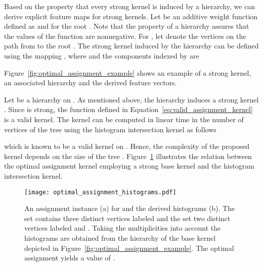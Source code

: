 \documentclass[twoside,11pt]{article}
\begin{document}
Based on the property that every strong kernel is induced by a hierarchy, we can derive explicit feature maps for strong kernels.
Let  be an additive weight function defined as  and  for the root .
Note that the property of a hierarchy assures that the values of the  function are nonnegative.
For , let  denote the vertices on the path from  to the root .
The strong kernel  induced by the hierarchy  can be defined using the mapping , where  and the components indexed by  are

Figure~\ref{fig:optimal_assignment_example} shows an example of a strong kernel, an associated hierarchy and the derived feature vectors.

Let  be a hierarchy on .
As mentioned above, the hierarchy  induces a strong kernel .
Since  is strong, the function  defined in Equation~\ref{eq:valid_assignment_kernel} is a valid kernel.
The kernel  can be computed in linear time in the number of vertices  of the tree  using the histogram intersection kernel \cite{swain1991color} as follows

which is known to be a valid kernel on  \cite{barla2003histogram}.
Hence, the complexity of the proposed kernel depends on the size of the tree .
Figure~\ref{fig:optimal_assignment_histograms} illustrates the relation between the optimal assignment kernel employing a strong base kernel and the histogram intersection kernel.
\begin{figure}[t]
  \centering
  \texttt{[image: optimal\_assignment\_histograms.pdf]}
  \caption{An assignment instance (a) for  and the derived histograms (b). The set  contains three distinct vertices labeled  and the set  two distinct vertices labeled  and . Taking the multiplicities into account the histograms are obtained from the hierarchy of the base kernel  depicted in Figure~\ref{fig:optimal_assignment_example}.  The optimal assignment yields a value of .}
  \label{fig:optimal_assignment_histograms}
\end{figure}
\end{document}
